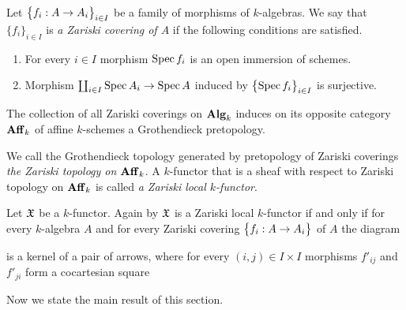 \begin{definition}
Let $\big\{f_i:A\rightarrow A_i\big\}_{i\in I}$ be a family of morphisms of $k$-algebras. We say that $\{f_i\}_{i\in I}$ is \textit{a Zariski covering of $A$} if the following conditions are satisfied.
\begin{enumerate}[label=\textbf{(\arabic*)}, leftmargin=1.5em]
\item For every $i\in I$ morphism $\mathrm{Spec}\, f_i$ is an open immersion of schemes.
\item Morphism $\coprod_{i\in I}\mathrm{Spec}\, A_i\rightarrow \mathrm{Spec}\, A$ induced by $\big\{\mathrm{Spec}\, f_i\big\}_{i\in I}$ is surjective.
\end{enumerate}
\end{definition}
\noindent
The collection of all Zariski coverings on $\mathbf{Alg}_k$ induces on its opposite category $\mathbf{Aff}_k$ of affine $k$-schemes a Grothendieck pretopology.

\begin{definition}
We call the Grothendieck topology generated by pretopology of Zariski coverings \textit{the Zariski topology on $\mathbf{Aff}_k$}. A $k$-functor that is a sheaf with respect to Zariski topology on $\mathbf{Aff}_k$ is called \textit{a Zariski local $k$-functor}.
\end{definition}
\noindent
Let ${\mathfrak X}$ be a $k$-functor. Again by {\cite[Theorem 3.5]{Sheaves}} ${\mathfrak X}$ is a Zariski local $k$-functor if and only if for every $k$-algebra $A$ and for every Zariski covering $\big\{f_i:A\rightarrow A_i\big\}$ of $A$ the diagram
\begin{center}
\end{center}
is a kernel of a pair of arrows, where for every $(i,j)\in I\times I$ morphisms $f'_{ij}$ and $f'_{ji}$ form a cocartesian square
\begin{center}
\end{center}
\noindent
Now we state the main result of this section.

